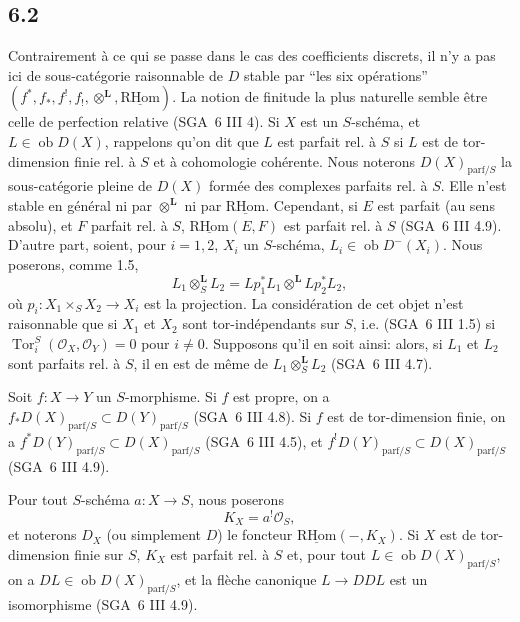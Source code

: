 \documentclass[11pt]{article}
\providecommand{\cO}{\mathcal{O}}
\DeclareMathOperator{\Tor}{Tor}
\providecommand{\RHom}{\mathrm{RHom}}
\providecommand{\uRHom}{\underline{\RHom}}
\providecommand{\RHom}{\mathrm{RHom}}
\providecommand{\RHom}{\mathrm R\mathcal{H}om}
\providecommand{\RHom}{\mathrm{RHom}}
\begin{document}
\subsection*{6.2}
Contrairement à ce qui se passe dans le cas des coefficients discrets, il n'y a pas ici de sous-catégorie raisonnable de $D$ stable par ``les six opérations'' $(f^*,f_*,f^!,f_!,\otimes^{\mathbf L},\uRHom)$. La notion de finitude la plus naturelle semble être celle de perfection relative (SGA~6 III 4). Si $X$ est un $S$-schéma, et $L\in\operatorname{ob}D(X)$, rappelons qu'on dit que $L$ est parfait rel. à $S$ si $L$ est de tor-dimension finie rel. à $S$ et à cohomologie cohérente. Nous noterons $D(X)_{\mathrm{parf}/S}$ la sous-catégorie pleine de $D(X)$ formée des complexes parfaits rel. à $S$. Elle n'est stable en général ni par $\otimes^{\mathbf L}$ ni par $\uRHom$. Cependant, si $E$ est parfait (au sens absolu), et $F$ parfait rel. à $S$, $\uRHom(E,F)$ est parfait rel. à $S$ (SGA~6 III 4.9). D'autre part, soient, pour $i=1,2$, $X_i$ un $S$-schéma, $L_i\in\operatorname{ob}D^{-}(X_i)$. Nous poserons, comme 1.5,
\[
L_1\otimes_S^{\mathbf L}L_2=Lp_1^*L_1\otimes^{\mathbf L}Lp_2^*L_2,
\]
où $p_i:X_1\times_SX_2\to X_i$ est la projection. La considération de cet objet n'est raisonnable que si $X_1$ et $X_2$ sont tor-indépendants sur $S$, i.e. (SGA~6 III 1.5) si $\Tor_i^S(\cO_X,\cO_Y)=0$ pour $i\ne0$. Supposons qu'il en soit ainsi: alors, si $L_1$ et $L_2$ sont parfaits rel. à $S$, il en est de même de $L_1\otimes_S^{\mathbf L}L_2$ (SGA~6 III 4.7).

Soit $f:X\to Y$ un $S$-morphisme. Si $f$ est propre, on a $f_*D(X)_{\mathrm{parf}/S}\subset D(Y)_{\mathrm{parf}/S}$ (SGA~6 III 4.8). Si $f$ est de tor-dimension finie, on a $f^*D(Y)_{\mathrm{parf}/S}\subset D(X)_{\mathrm{parf}/S}$ (SGA~6 III 4.5), et $f^!D(Y)_{\mathrm{parf}/S}\subset D(X)_{\mathrm{parf}/S}$ (SGA~6 III 4.9).

Pour tout $S$-schéma $a:X\to S$, nous poserons
\begin{equation}
\tag{6.2.1}
K_X=a^!\cO_S,
\end{equation}
et noterons $D_X$ (ou simplement $D$) le foncteur $\uRHom(-,K_X)$. Si $X$ est de tor-dimension finie sur $S$, $K_X$ est parfait rel. à $S$ et, pour tout $L\in\operatorname{ob}D(X)_{\mathrm{parf}/S}$, on a $DL\in\operatorname{ob}D(X)_{\mathrm{parf}/S}$, et la flèche canonique $L\to DDL$ est un isomorphisme (SGA~6 III 4.9).
\end{document}

